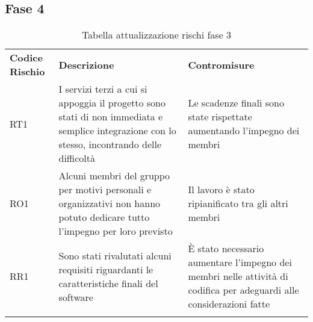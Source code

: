 \subsection{Fase 4}
\label{sec:fase_3}
\begin{center}
\renewcommand{\arraystretch}{1.5}
	\begin{longtable}[H]{  	>{\Centering}p{2cm}	
							>{\RaggedRight}p{6cm}	
							>{\RaggedRight}p{6cm}  
							}
							
		\rowcolor{tableHeadYellow}
		\textbf{Codice Rischio}   & \textbf{Descrizione} & \textbf{Contromisure}\\ 
		RT1	&	I servizi terzi a cui si appoggia il progetto sono stati di non immediata e semplice integrazione con lo stesso, incontrando delle difficoltà & Le scadenze finali sono state rispettate aumentando l'impegno dei membri\\
		RO1	&	Alcuni membri del gruppo per motivi personali e organizzativi non hanno potuto dedicare tutto l'impegno per loro previsto & Il lavoro è stato ripianificato tra gli altri membri\\
		RR1	&	Sono stati rivalutati alcuni requisiti riguardanti le caratteristiche finali del software & È stato necessario aumentare l'impegno dei membri nelle attività di codifica per adeguardi alle considerazioni fatte\\
		
		\rowcolor{white}
		\caption{Tabella attualizzazione rischi fase 3}
	\end{longtable}
\end{center}
